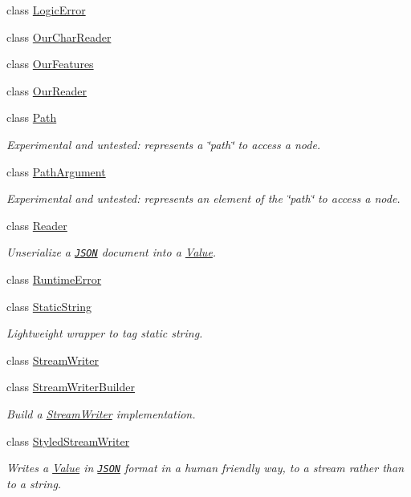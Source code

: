\begin{DoxyCompactItemize}
class \hyperlink{class_json_1_1_logic_error}{Logic\+Error}
\item 
class \hyperlink{class_json_1_1_our_char_reader}{Our\+Char\+Reader}
\item 
class \hyperlink{class_json_1_1_our_features}{Our\+Features}
\item 
class \hyperlink{class_json_1_1_our_reader}{Our\+Reader}
\item 
class \hyperlink{class_json_1_1_path}{Path}
\begin{DoxyCompactList}\small\item\em Experimental and untested\+: represents a \char`\"{}path\char`\"{} to access a node. \end{DoxyCompactList}\item 
class \hyperlink{class_json_1_1_path_argument}{Path\+Argument}
\begin{DoxyCompactList}\small\item\em Experimental and untested\+: represents an element of the \char`\"{}path\char`\"{} to access a node. \end{DoxyCompactList}\item 
class \hyperlink{class_json_1_1_reader}{Reader}
\begin{DoxyCompactList}\small\item\em Unserialize a \href{http://www.json.org}{\tt J\+S\+ON} document into a \hyperlink{class_json_1_1_value}{Value}. \end{DoxyCompactList}\item 
class \hyperlink{class_json_1_1_runtime_error}{Runtime\+Error}
\item 
class \hyperlink{class_json_1_1_static_string}{Static\+String}
\begin{DoxyCompactList}\small\item\em Lightweight wrapper to tag static string. \end{DoxyCompactList}\item 
class \hyperlink{class_json_1_1_stream_writer}{Stream\+Writer}
\item 
class \hyperlink{class_json_1_1_stream_writer_builder}{Stream\+Writer\+Builder}
\begin{DoxyCompactList}\small\item\em Build a \hyperlink{class_json_1_1_stream_writer}{Stream\+Writer} implementation. \end{DoxyCompactList}\item 
class \hyperlink{class_json_1_1_styled_stream_writer}{Styled\+Stream\+Writer}
\begin{DoxyCompactList}\small\item\em Writes a \hyperlink{class_json_1_1_value}{Value} in \href{http://www.json.org}{\tt J\+S\+ON} format in a human friendly way, to a stream rather than to a string. \end{DoxyCompactList}\item 

\end{DoxyCompactItemize}
